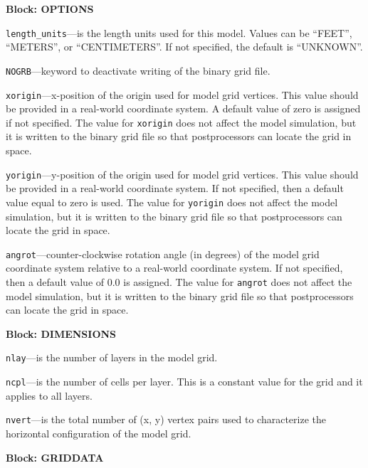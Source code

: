 
\item \textbf{Block: OPTIONS}

\begin{description}
\item \texttt{length\_units}---is the length units used for this model.  Values can be ``FEET'', ``METERS'', or ``CENTIMETERS''.  If not specified, the default is ``UNKNOWN''.

\item \texttt{NOGRB}---keyword to deactivate writing of the binary grid file.

\item \texttt{xorigin}---x-position of the origin used for model grid vertices.  This value should be provided in a real-world coordinate system.  A default value of zero is assigned if not specified.  The value for \texttt{xorigin} does not affect the model simulation, but it is written to the binary grid file so that postprocessors can locate the grid in space.

\item \texttt{yorigin}---y-position of the origin used for model grid vertices.  This value should be provided in a real-world coordinate system.  If not specified, then a default value equal to zero is used.  The value for \texttt{yorigin} does not affect the model simulation, but it is written to the binary grid file so that postprocessors can locate the grid in space.

\item \texttt{angrot}---counter-clockwise rotation angle (in degrees) of the model grid coordinate system relative to a real-world coordinate system.  If not specified, then a default value of 0.0 is assigned.  The value for \texttt{angrot} does not affect the model simulation, but it is written to the binary grid file so that postprocessors can locate the grid in space.

\end{description}
\item \textbf{Block: DIMENSIONS}

\begin{description}
\item \texttt{nlay}---is the number of layers in the model grid.

\item \texttt{ncpl}---is the number of cells per layer.  This is a constant value for the grid and it applies to all layers.

\item \texttt{nvert}---is the total number of (x, y) vertex pairs used to characterize the horizontal configuration of the model grid.

\end{description}
\item \textbf{Block: GRIDDATA}

